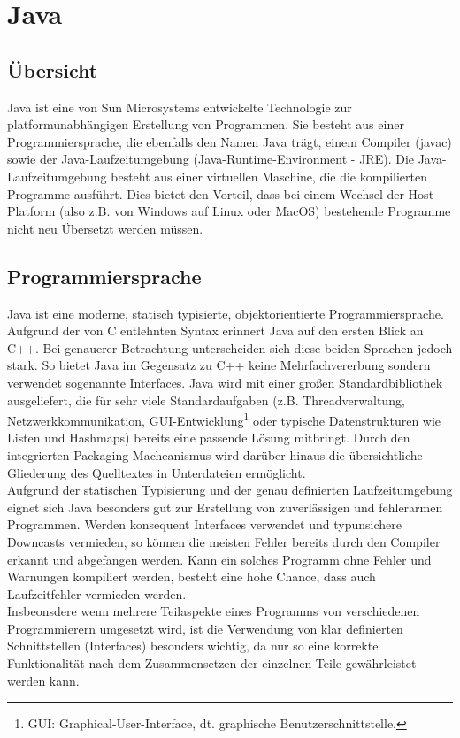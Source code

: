 \section{Java}
    \subsection{Übersicht}

        Java ist eine von Sun Microsystems entwickelte Technologie zur platformunabhängigen 
        Erstellung von Programmen. Sie besteht aus einer Programmiersprache, die ebenfalls den Namen
        Java trägt, einem Compiler (javac) sowie der Java-Laufzeitumgebung (Java-Runtime-Environment - JRE).
        Die Java-Laufzeitumgebung besteht aus einer virtuellen Maschine, die die kompilierten Programme ausführt.
        Dies bietet den Vorteil, dass bei einem Wechsel der Host-Platform (also z.B. von Windows auf Linux oder MacOS) 
        bestehende Programme nicht neu Übersetzt werden müssen.\\

    \subsection{Programmiersprache}
        Java ist eine moderne, statisch typisierte, objektorientierte Programmiersprache. Aufgrund der von C entlehnten 
        Syntax erinnert Java auf den ersten Blick an C++. Bei genauerer Betrachtung unterscheiden sich diese beiden 
        Sprachen jedoch stark. So bietet Java im Gegensatz zu C++ keine Mehrfachvererbung sondern verwendet sogenannte
        Interfaces. Java wird mit einer großen Standardbibliothek ausgeliefert, die für sehr viele Standardaufgaben
        (z.B. Threadverwaltung, Netzwerkkommunikation, GUI-Entwicklung\footnote{GUI: Graphical-User-Interface, dt. 
        graphische Benutzerschnittstelle.} oder typische Datenstrukturen wie Listen und Hashmaps) bereits eine
        passende Lösung mitbringt. Durch den integrierten Packaging-Macheanismus wird darüber hinaus die übersichtliche
        Gliederung des Quelltextes in Unterdateien ermöglicht.\\
        Aufgrund der statischen Typisierung und der genau definierten Laufzeitumgebung eignet sich Java besonders
        gut zur Erstellung von zuverlässigen und fehlerarmen Programmen. Werden konsequent Interfaces verwendet und
        typunsichere Downcasts vermieden, so können die meisten Fehler bereits durch den Compiler erkannt und abgefangen 
        werden. Kann ein solches Programm ohne Fehler und Warnungen kompiliert werden, besteht eine hohe Chance,
        dass auch Laufzeitfehler vermieden werden.\\
        Insbeonsdere wenn mehrere Teilaspekte eines Programms von verschiedenen Programmierern umgesetzt wird, 
        ist die Verwendung von klar definierten Schnittstellen (Interfaces) besonders wichtig, da nur so eine korrekte
        Funktionalität nach dem Zusammensetzen der einzelnen Teile gewährleistet werden kann.
        
